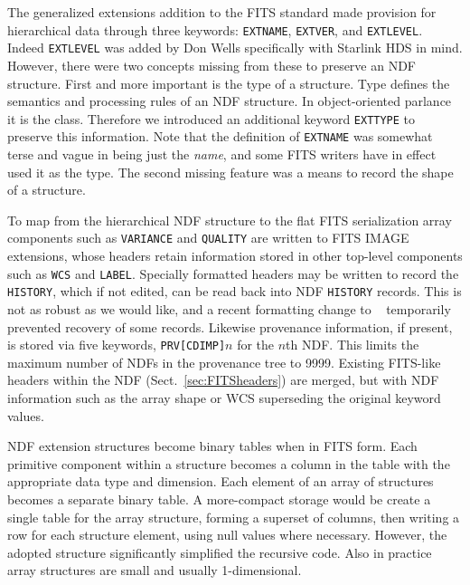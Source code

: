 \documentclass[final,authoryear,5p,times,twocolumn]{elsarticle}
\newcommand*\secref[1]{Sect.~\ref{#1}}
\begin{document}
The generalized extensions \citep{1988A&AS...73..359G} addition to the
FITS standard made provision for hierarchical data through three
keywords: \texttt{EXTNAME}, \texttt{EXTVER}, and \texttt{EXTLEVEL}.  Indeed \texttt{EXTLEVEL} was added by
Don Wells specifically with Starlink HDS in mind.  However, there were
two concepts missing from these to preserve an NDF structure.  First
and more important is the type of a structure.  Type defines the
semantics and processing rules of an NDF structure.  In
object-oriented parlance it is the class.  Therefore we introduced an
additional keyword \texttt{EXTTYPE} to preserve this information.  Note that
the definition of \texttt{EXTNAME} was somewhat terse and vague in
\citet{1988A&AS...73..359G} being just the \emph{name}, and some FITS
writers have in effect used it as the type.  The second missing
feature was a means to record the shape of a structure.

To map from the hierarchical NDF structure to the flat FITS
serialization array components such as \texttt{VARIANCE} and \texttt{QUALITY} are
written to FITS IMAGE extensions, whose headers retain information
stored in other top-level components such as \texttt{WCS} and \texttt{LABEL}.  Specially
formatted headers may be written to record the \texttt{HISTORY}, which if not
edited, can be read back into NDF \texttt{HISTORY} records.  This is not as
robust as we would like, and a recent formatting change to
\CFITSIO\ \citep[][]{1999ASPC..172..487P}
temporarily prevented recovery of some records.  Likewise provenance
information, if present, is stored via five keywords, \texttt{PRV[CDIMP]$n$}
for the $n$th NDF. This limits the maximum number of NDFs in the
provenance tree to 9999.  Existing FITS-like headers within the NDF
(\secref{sec:FITSheaders}) are merged, but with NDF information
such as the array shape or WCS superseding the original keyword
values.

NDF extension structures become binary tables when in FITS form.  Each
primitive component within a structure becomes a column in the table
with the appropriate data type and dimension.  Each element of an
array of structures becomes a separate binary table.  A more-compact
storage would be create a single table for the array structure,
forming a superset of columns, then writing a row for each structure
element, using null values where necessary.  However, the adopted
structure significantly simplified the recursive code.  Also in practice
array structures are small and usually 1-dimensional.
\end{document}
